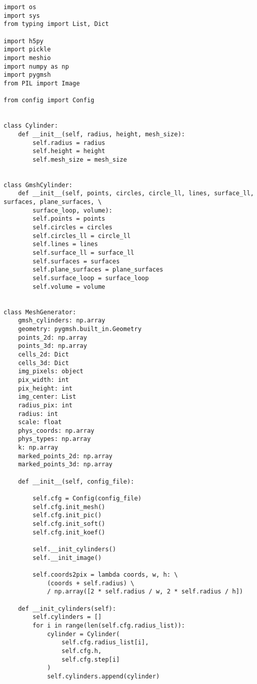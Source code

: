 \begin{lstlisting}[caption=Исходный код модуля генерации расчетной сетки и её маркировки, 
                    label={lst_meshgen_all}, basicstyle=\scriptsize]
import os
import sys
from typing import List, Dict

import h5py
import pickle
import meshio
import numpy as np
import pygmsh
from PIL import Image

from config import Config


class Cylinder:
    def __init__(self, radius, height, mesh_size):
        self.radius = radius
        self.height = height
        self.mesh_size = mesh_size


class GmshCylinder:
    def __init__(self, points, circles, circle_ll, lines, surface_ll, surfaces, plane_surfaces, \
        surface_loop, volume):
        self.points = points
        self.circles = circles
        self.circles_ll = circle_ll
        self.lines = lines
        self.surface_ll = surface_ll
        self.surfaces = surfaces
        self.plane_surfaces = plane_surfaces
        self.surface_loop = surface_loop
        self.volume = volume


class MeshGenerator:
    gmsh_cylinders: np.array
    geometry: pygmsh.built_in.Geometry  
    points_2d: np.array 
    points_3d: np.array 
    cells_2d: Dict  
    cells_3d: Dict  
    img_pixels: object
    pix_width: int 
    pix_height: int 
    img_center: List
    radius_pix: int
    radius: int
    scale: float
    phys_coords: np.array
    phys_types: np.array 
    k: np.array 
    marked_points_2d: np.array
    marked_points_3d: np.array

    def __init__(self, config_file):

        self.cfg = Config(config_file)
        self.cfg.init_mesh()
        self.cfg.init_pic()
        self.cfg.init_soft()
        self.cfg.init_koef()
        
        self.__init_cylinders()
        self.__init_image()

        self.coords2pix = lambda coords, w, h: \
            (coords + self.radius) \
            / np.array([2 * self.radius / w, 2 * self.radius / h])

    def __init_cylinders(self):
        self.cylinders = []
        for i in range(len(self.cfg.radius_list)):
            cylinder = Cylinder(
                self.cfg.radius_list[i],
                self.cfg.h,
                self.cfg.step[i]
            )
            self.cylinders.append(cylinder)


\end{lstlisting}
